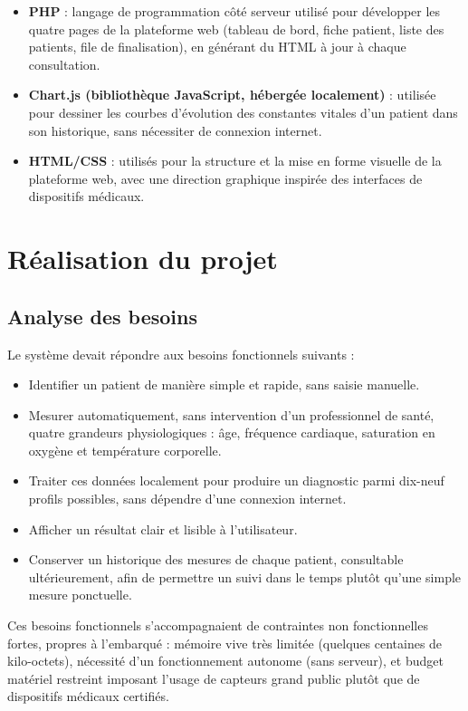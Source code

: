 \documentclass[12pt,a4paper]{report}
\begin{document}
\begin{itemize}
    \item \textbf{PHP} : langage de programmation côté serveur utilisé pour développer les quatre pages de la plateforme web (tableau de bord, fiche patient, liste des patients, file de finalisation), en générant du HTML à jour à chaque consultation.
    \item \textbf{Chart.js (bibliothèque JavaScript, hébergée localement)} : utilisée pour dessiner les courbes d'évolution des constantes vitales d'un patient dans son historique, sans nécessiter de connexion internet.
    \item \textbf{HTML/CSS} : utilisés pour la structure et la mise en forme visuelle de la plateforme web, avec une direction graphique inspirée des interfaces de dispositifs médicaux.
\end{itemize}

\chapter{Réalisation du projet}

\section{Analyse des besoins}
Le système devait répondre aux besoins fonctionnels suivants :
\begin{itemize}
    \item Identifier un patient de manière simple et rapide, sans saisie manuelle.
    \item Mesurer automatiquement, sans intervention d'un professionnel de santé, quatre grandeurs physiologiques : âge, fréquence cardiaque, saturation en oxygène et température corporelle.
    \item Traiter ces données localement pour produire un diagnostic parmi dix-neuf profils possibles, sans dépendre d'une connexion internet.
    \item Afficher un résultat clair et lisible à l'utilisateur.
    \item Conserver un historique des mesures de chaque patient, consultable ultérieurement, afin de permettre un suivi dans le temps plutôt qu'une simple mesure ponctuelle.
\end{itemize}

Ces besoins fonctionnels s'accompagnaient de contraintes non fonctionnelles fortes, propres à l'embarqué : mémoire vive très limitée (quelques centaines de kilo-octets), nécessité d'un fonctionnement autonome (sans serveur), et budget matériel restreint imposant l'usage de capteurs grand public plutôt que de dispositifs médicaux certifiés.
\end{document}
